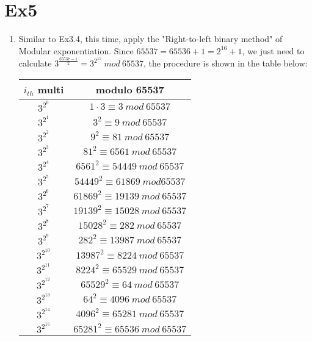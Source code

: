 \documentclass[12pt, a4paper]{article}
\begin{document}
\section*{Ex5}
\begin{enumerate}
    \item Similar to Ex3.4, this time, apply the "Right-to-left binary method" of Modular exponentiation. 
          Since $65537 = 65536 + 1 = 2^{16} + 1$, we just need to calculate $3^{\frac{65537-1}{2}} = 3^{2^{15}}\ mod\ 65537$, 
          the procedure is shown in the table below:
          \begin{center}
              \begin{tabular}{c|c}
                \hline
                $i_{th}$ multi & modulo 65537\\
                \hline
                $3^{2^0}$ & $1\cdot 3 \equiv 3\ mod\ 65537$\\
                $3^{2^1}$ & $3^2 \equiv 9\ mod\ 65537$\\
                $3^{2^2}$ & $9^2 \equiv 81\ mod\ 65537$\\
                $3^{2^3}$ & $81^2 \equiv 6561\ mod\ 65537$\\
                $3^{2^4}$ & $6561^2 \equiv 54449\ mod\ 65537$\\
                $3^{2^5}$ & $54449^2 \equiv 61869\ mod 65537$\\
                $3^{2^6}$ & $61869^2 \equiv 19139\ mod\ 65537$\\
                $3^{2^7}$ & $19139^2 \equiv 15028\ mod\ 65537$\\
                $3^{2^8}$ & $15028^2 \equiv 282\ mod\ 65537$\\
                $3^{2^9}$ & $282^2 \equiv 13987\ mod\ 65537$\\
                $3^{2^{10}}$ & $13987^2 \equiv 8224\ mod\ 65537$\\
                $3^{2^{11}}$ & $8224^2 \equiv 65529\ mod\ 65537$\\
                $3^{2^{12}}$ & $65529^2 \equiv 64\ mod\ 65537$\\
                $3^{2^{13}}$ & $64^2 \equiv 4096\ mod\ 65537$\\
                $3^{2^{14}}$ & $4096^2 \equiv 65281\ mod\ 65537$\\
                $3^{2^{15}}$ & $65281^2 \equiv 65536\ mod\ 65537$\\
              \end{tabular}
          \end{center}

\end{enumerate}
\end{document}
